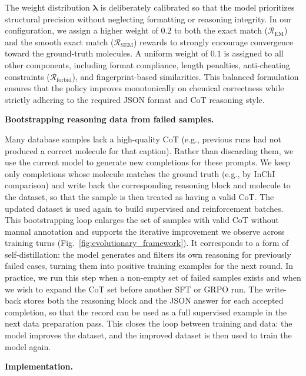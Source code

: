 \documentclass[11pt]{article}
\begin{document}
The weight distribution $\boldsymbol{\lambda}$ is deliberately calibrated so that the model prioritizes structural precision without neglecting formatting or reasoning integrity. In our configuration, we assign a higher weight of $0.2$ to both the exact match ($\mathcal{R}_{\text{EM}}$) and the smooth exact match ($\mathcal{R}_{\text{SEM}}$) rewards to strongly encourage convergence toward the ground-truth molecules. A uniform weight of $0.1$ is assigned to all other components, including format compliance, length penalties, anti-cheating constraints ($\mathcal{R}_{\text{forbid}}$), and fingerprint-based similarities. This balanced formulation ensures that the policy improves monotonically on chemical correctness while strictly adhering to the required JSON format and CoT reasoning style.

\noindent\textbf{Bootstrapping reasoning data from failed samples.}

Many database samples lack a high-quality CoT (e.g., previous runs had not produced a correct molecule for that caption). Rather than discarding them, we use the current model to generate new completions for these prompts. We keep only completions whose molecule matches the ground truth (e.g., by InChI comparison) and write back the corresponding reasoning block and molecule to the dataset, so that the sample is then treated as having a valid CoT. The updated dataset is used again to build supervised and reinforcement batches. This bootstrapping loop enlarges the set of samples with valid CoT without manual annotation and supports the iterative improvement we observe across training turns (Fig.~\ref{fig:evolutionary_framework}). It corresponds to a form of self-distillation: the model generates and filters its own reasoning for previously failed cases, turning them into positive training examples for the next round. In practice, we run this step when a non-empty set of failed samples exists and when we wish to expand the CoT set before another SFT or GRPO run. The write-back stores both the reasoning block and the JSON answer for each accepted completion, so that the record can be used as a full supervised example in the next data preparation pass. This closes the loop between training and data: the model improves the dataset, and the improved dataset is then used to train the model again.

\noindent\textbf{Implementation.}
\end{document}
